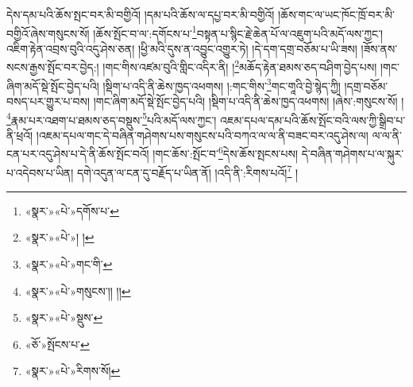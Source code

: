 དེས་དམ་པའི་ཆོས་སྤང་བར་མི་བགྱིའོ། །དམ་པའི་ཆོས་ལ་དཔྱ་བར་མི་བགྱིའོ། །ཆོས་གང་ལ་ཡང་ཁོང་ཁྲོ་བར་མི་བགྱིའོ་ཞེས་གསུངས་སོ། །ཆོས་སྤོང་བ་ལ་:དགོངས་པ་\footnote{«སྣར་»«པེ་»དགོས་པ་}བསྟན་པ་སྙིང་རྗེ་ཆེན་པོ་ལ་འཇུག་པའི་མདོ་ལས་ཀྱང་། འཇིག་རྟེན་འབྲས་བུའི་འདུ་ཤེས་ཅན། །ཕྱི་མའི་དུས་ན་འབྱུང་འགྱུར་ཏེ། །དེ་དག་དགྲ་བཅོམ་པ་ཡི་ཟས། །ཟོས་ནས་སངས་རྒྱས་སྤོང་བར་བྱེད:། །གང་གིས་འཛམ་བུའི་གླིང་འདིར་ནི། །\footnote{«སྣར་»«པེ་»། །}མཆོད་རྟེན་ཐམས་ཅད་བཤིག་བྱེད་པས། །གང་ཞིག་མདོ་སྡེ་སྤོང་བྱེད་པའི། །སྡིག་པ་འདི་ནི་ཆེས་ཁྱད་འཕགས། །:གང་གིས་\footnote{«སྣར་»«པེ་»གང་གི་}གང་གཱའི་བྱེ་སྙེད་ཀྱི། །དགྲ་བཅོམ་བསད་པར་གྱུར་པ་བས། །གང་ཞིག་མདོ་སྡེ་སྤོང་བྱེད་པའི། །སྡིག་པ་འདི་ནི་ཆེས་ཁྱད་འཕགས། །ཞེས་:གསུངས་སོ། །\footnote{«སྣར་»«པེ་»གསུངས་།། །།}རྣམ་པར་འཐག་པ་ཐམས་ཅད་བསྡུས་\footnote{«སྣར་»«པེ་»སྡུས་}པའི་མདོ་ལས་ཀྱང་། འཇམ་དཔལ་དམ་པའི་ཆོས་སྤོང་བའི་ལས་ཀྱི་སྒྲིབ་པ་ནི་ཕྲའོ། །འཇམ་དཔལ་གང་དེ་བཞིན་གཤེགས་པས་གསུངས་པའི་བཀའ་ལ་ལ་ནི་བཟང་བར་འདུ་ཤེས་ལ། ལ་ལ་ནི་ངན་པར་འདུ་ཤེས་པ་དེ་ནི་ཆོས་སྤོང་བའོ། །གང་ཆོས་:སྤོང་བ་\footnote{«ཅོ་»སྤོངས་པ་}དེས་ཆོས་སྤངས་པས། དེ་བཞིན་གཤེགས་པ་ལ་སྐུར་པ་འདེབས་པ་ཡིན། དགེ་འདུན་ལ་ངན་དུ་བརྗོད་པ་ཡིན་ནོ། །འདི་ནི་:རིགས་པའོ།\footnote{«སྣར་»«པེ་»རིགས་སོ།} །
